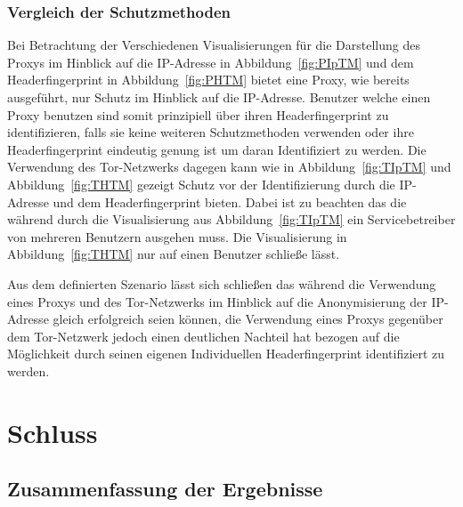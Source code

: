 \documentclass[
    fontsize=12pt,
    headings=small,
    parskip=half,           %
    bibliography=totoc,
    numbers=noenddot,       %
    open=any,               %
    ]{scrreprt}
\begin{document}
    \subsection{Vergleich der Schutzmethoden}
Bei Betrachtung der Verschiedenen Visualisierungen für die Darstellung des Proxys im Hinblick auf die IP-Adresse in Abbildung~\ref{fig:PIpTM} und dem Headerfingerprint in Abbildung~\ref{fig:PHTM} bietet eine Proxy, wie bereits ausgeführt, nur Schutz im Hinblick auf die IP-Adresse.
Benutzer welche einen Proxy benutzen sind somit prinzipiell über ihren Headerfingerprint zu identifizieren, falls sie keine weiteren Schutzmethoden verwenden oder ihre Headerfingerprint eindeutig genung ist um daran Identifiziert zu werden. 
Die Verwendung des Tor-Netzwerks dagegen kann wie in Abbildung~\ref{fig:TIpTM} und Abbildung~\ref{fig:THTM} gezeigt Schutz vor der Identifizierung durch die IP-Adresse und dem Headerfingerprint bieten.
Dabei ist zu beachten das die während durch die Visualisierung aus Abbildung~\ref{fig:TIpTM} ein Servicebetreiber von mehreren Benutzern ausgehen muss.
Die Visualisierung in Abbildung~\ref{fig:THTM} nur auf einen Benutzer schließe lässt.

Aus dem definierten Szenario lässt sich schließen das während die Verwendung eines Proxys und des Tor-Netzwerks im Hinblick auf die Anonymisierung der IP-Adresse gleich erfolgreich seien können, die Verwendung eines Proxys gegenüber dem Tor-Netzwerk jedoch einen deutlichen Nachteil hat bezogen auf die Möglichkeit durch seinen eigenen Individuellen Headerfingerprint identifiziert zu werden.

\chapter{Schluss}
\section{Zusammenfassung der Ergebnisse}
\end{document}
